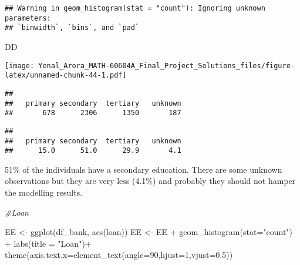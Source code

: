 \documentclass[
]{article}
\newenvironment{Shaded}{\begin{snugshade}}{\end{snugshade}}
\newcommand{\AttributeTok}[1]{\textcolor[rgb]{0.77,0.63,0.00}{#1}}
\newcommand{\CommentTok}[1]{\textcolor[rgb]{0.56,0.35,0.01}{\textit{#1}}}
\newcommand{\DecValTok}[1]{\textcolor[rgb]{0.00,0.00,0.81}{#1}}
\newcommand{\FloatTok}[1]{\textcolor[rgb]{0.00,0.00,0.81}{#1}}
\newcommand{\FunctionTok}[1]{\textcolor[rgb]{0.00,0.00,0.00}{#1}}
\newcommand{\NormalTok}[1]{#1}
\newcommand{\OtherTok}[1]{\textcolor[rgb]{0.56,0.35,0.01}{#1}}
\newcommand{\SpecialCharTok}[1]{\textcolor[rgb]{0.00,0.00,0.00}{#1}}
\newcommand{\StringTok}[1]{\textcolor[rgb]{0.31,0.60,0.02}{#1}}
\begin{document}
\begin{verbatim}
## Warning in geom_histogram(stat = "count"): Ignoring unknown parameters:
## `binwidth`, `bins`, and `pad`
\end{verbatim}

\begin{Shaded}
\begin{Highlighting}[]
\NormalTok{DD}
\end{Highlighting}
\end{Shaded}

\texttt{[image: Yenal\_Arora\_MATH-60604A\_Final\_Project\_Solutions\_files/figure-latex/unnamed-chunk-44-1.pdf]}

\begin{Shaded}
\end{Shaded}

\begin{verbatim}
## 
##   primary secondary  tertiary   unknown 
##       678      2306      1350       187
\end{verbatim}

\begin{Shaded}
\end{Shaded}

\begin{verbatim}
## 
##   primary secondary  tertiary   unknown 
##      15.0      51.0      29.9       4.1
\end{verbatim}

51\% of the individuals have a secondary education. There are some
unknown observations but they are very less (4.1\%) and probably they
should not hamper the modelling results.

\begin{Shaded}
\begin{Highlighting}[]
\CommentTok{\#Loan}

\NormalTok{EE }\OtherTok{\textless{}{-}} \FunctionTok{ggplot}\NormalTok{(df\_bank, }\FunctionTok{aes}\NormalTok{(loan))}
\NormalTok{EE }\OtherTok{\textless{}{-}}\NormalTok{ EE }\SpecialCharTok{+} \FunctionTok{geom\_histogram}\NormalTok{(}\AttributeTok{stat=}\StringTok{"count"}\NormalTok{) }\SpecialCharTok{+} \FunctionTok{labs}\NormalTok{(}\AttributeTok{title =} \StringTok{"Loan"}\NormalTok{)}\SpecialCharTok{+}
  \FunctionTok{theme}\NormalTok{(}\AttributeTok{axis.text.x=}\FunctionTok{element\_text}\NormalTok{(}\AttributeTok{angle=}\DecValTok{90}\NormalTok{,}\AttributeTok{hjust=}\DecValTok{1}\NormalTok{,}\AttributeTok{vjust=}\FloatTok{0.5}\NormalTok{))}
\end{Highlighting}
\end{Shaded}
\end{document}
